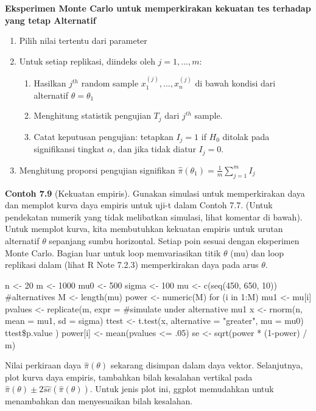 \documentclass[a4paper,12pt]{article}
\theoremstyle{definition}
\begin{document}
\textbf{Eksperimen Monte Carlo untuk memperkirakan kekuatan tes terhadap yang tetap
Alternatif}

\begin{enumerate}
    \item Pilih nilai tertentu dari parameter
    \item Untuk setiap replikasi, diindeks oleh $j = 1,...,m:$
    \begin{enumerate}
        \item Hasilkan $j^{th}$ random sample $x_{1}^{(j)},...,x_{n}^{(j)}$ di bawah kondisi dari alternatif $\theta = \theta_{1}$
        \item  Menghitung statistik pengujian $T_{j}$ dari $j^{th}$ sample.
        \item  Catat keputusan pengujian: tetapkan $I_{j} = 1$ if $H_{0}$ ditolak pada signifikansi tingkat $\alpha $, dan jika tidak diatur $I_{j} = 0.$
    \end{enumerate}
    \item  Menghitung proporsi pengujian signifikan $\hat{\pi } (\theta _{1}) = \frac{1}{m}\sum_{j=1}^{m} I_{j}$
\end{enumerate}

\textbf{Contoh 7.9} (Kekuatan empiris). Gunakan simulasi untuk memperkirakan daya dan memplot kurva daya empiris untuk uji-t dalam Contoh 7.7. (Untuk pendekatan numerik yang tidak melibatkan simulasi, lihat komentar di bawah). Untuk memplot kurva, kita membutuhkan kekuatan empiris untuk urutan alternatif
$\theta$ sepanjang sumbu horizontal. Setiap poin sesuai dengan eksperimen Monte Carlo. Bagian luar untuk loop memvariasikan titik $\theta$ (mu) dan loop replikasi dalam (lihat R Note 7.2.3) memperkirakan daya pada arus $\theta$.
\begin{spverbatim}
n <- 20
m <- 1000
mu0 <- 500
sigma <- 100 
mu <- c(seq(450, 650, 10)) #alternatives
M <- length(mu)
power <- numeric(M)
for (i in 1:M) {
    mu1 <- mu[i]
    pvalues <- replicate(m, expr = {
        #simulate under alternative mu1
        x <- rnorm(n, mean = mu1, sd = sigma)
        ttest <- t.test(x,
                alternative = "greater", mu = mu0)
        ttest\$p.value } )
    power[i] <- mean(pvalues <= .05)
}
se <- sqrt(power * (1-power) / m)
\end{spverbatim}

Nilai perkiraan daya $\hat{\pi}(\theta)$ sekarang disimpan dalam daya vektor. Selanjutnya, plot kurva daya empiris, tambahkan bilah kesalahan vertikal pada $\hat{\pi}(\theta)\pm 2\hat{se}(\hat{\pi}(\theta))$. Untuk jenis plot ini, ggplot memudahkan untuk menambahkan dan menyesuaikan bilah kesalahan.
\end{document}
